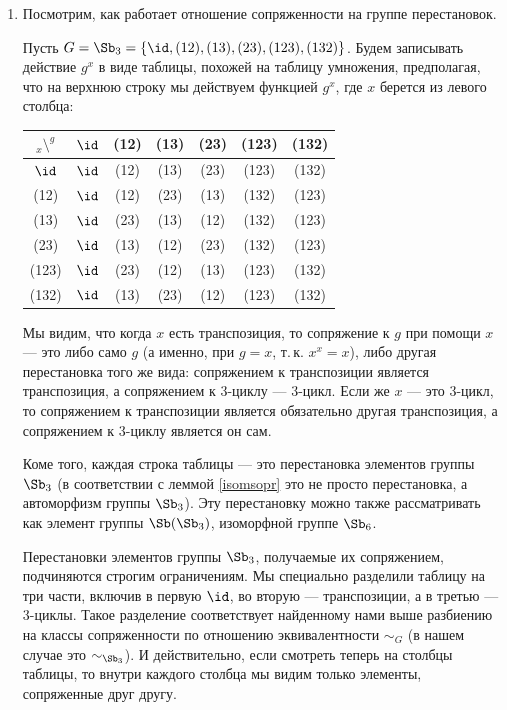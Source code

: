 \begin{enumerate}


\item Посмотрим, как работает отношение сопряженности на группе перестановок.

Пусть $G=\Sb_3 = \{\id,(12),(13),(23),(123),(132)\}$. Будем записывать действие $g^x$ в виде таблицы, похожей на таблицу умножения, предполагая, что на верхнюю строку мы действуем функцией $g^x$, где $x$ берется из левого столбца:
\begin{center}
\begin{tabular}{c|c|ccc|cc}
${}_x\setminus^g$&  $\id$	& (12)	& (13)	& (23)	& (123)	& (132) \\ \hline
$\id$&$\id$	& (12)	& (13)	& (23)	& (123)	& (132) \\
(12)& $\id$	& (12)	& (23)	& (13)	& (132)	& (123) \\
(13)& $\id$	& (23)	& (13)	& (12)	& (132)	& (123) \\
(23)& $\id$	& (13)	& (12)	& (23)	& (132)	& (123) \\
(123)&$\id$	& (23)	& (12)	& (13)	& (123)	& (132) \\
(132)&$\id$	& (13)	& (23)	& (12)	& (123)	& (132)
\end{tabular}
\end{center}
Мы видим, что когда $x$ есть транспозиция, то сопряжение к $g$ при помощи $x$ --- это либо само $g$ (а именно, при $g=x$, т.\,к. $x^x=x$), либо другая перестановка того же вида: сопряжением к транспозиции является транспозиция, а сопряжением к 3-циклу --- 3-цикл. Если же $x$ --- это 3-цикл, то сопряжением к транспозиции является обязательно другая транспозиция, а сопряжением к 3-циклу является он сам.

Коме того, каждая строка таблицы --- это перестановка элементов группы $\Sb_3$ (в соответствии с леммой \ref{isomsopr} это не просто перестановка, а автоморфизм группы $\Sb_3$). Эту перестановку можно также рассматривать как элемент группы $\Sb(\Sb_3)$, изоморфной группе $\Sb_6$.

Перестановки элементов группы $\Sb_3$, получаемые их сопряжением, подчиняются строгим ограничениям. Мы специально разделили таблицу на три части, включив в первую $\id$, во вторую --- транспозиции, а в третью --- 3-циклы. Такое разделение соответствует найденному нами выше 
разбиению на классы сопряженности по
отношению эквивалентности $\sim_G$ (в нашем случае это $\sim_{\Sb_3}$). И действительно, если смотреть теперь на столбцы таблицы, то внутри каждого столбца мы видим только элементы, сопряженные друг другу.


\end{enumerate}
